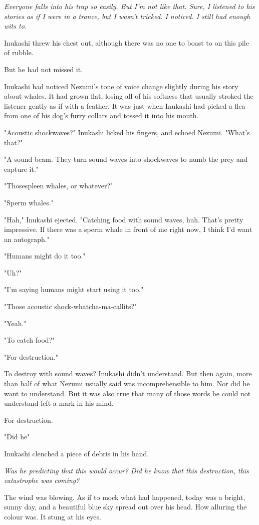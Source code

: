 \emph{Everyone falls into his trap so easily. But I'm not like that. Sure, I
listened to his stories as if I were in a trance, but I wasn't tricked.
I noticed. I still had enough wits to.}

Inukashi threw his chest out, although there was no one to boast to on
this pile of rubble.

But he had not missed it.

Inukashi had noticed Nezumi's tone of voice change slightly during his
story about whales. It had grown flat, losing all of his softness that
usually stroked the listener gently as if with a feather. It was just
when Inukashi had picked a flea from one of his dog's furry collars and
tossed it into his mouth.

"Acoustic shockwaves?" Inukashi licked his fingers, and echoed Nezumi.
"What's that?"

"A sound beam. They turn sound waves into shockwaves to numb the prey
and capture it."

"Those\el spleen whales, or whatever?"

"Sperm whales."

"Hah," Inukashi ejected. "Catching food with sound waves, huh. That's
pretty impressive. If there was a sperm whale in front of me right now,
I think I'd want an autograph."

"Humans might do it too."

"Uh?"

"I'm saying humans might start using it too."

"Those acoustic shock-whatcha-ma-callits?"

"Yeah."

"To catch food?"

"For destruction."

To destroy with sound waves? Inukashi didn't understand. But then again,
more than half of what Nezumi usually said was incomprehensible to him.
Nor did he want to understand. But it was also true that many of those
words he could not understand left a mark in his mind.

For destruction.

"Did he\el "

Inukashi clenched a piece of debris in his hand.

\emph{Was he predicting that this would occur? Did he know that this
destruction, this catastrophe was coming?}

The wind was blowing. As if to mock what had happened, today was a
bright, sunny day, and a beautiful blue sky spread out over his head.
How alluring the colour was. It stung at his eyes.

